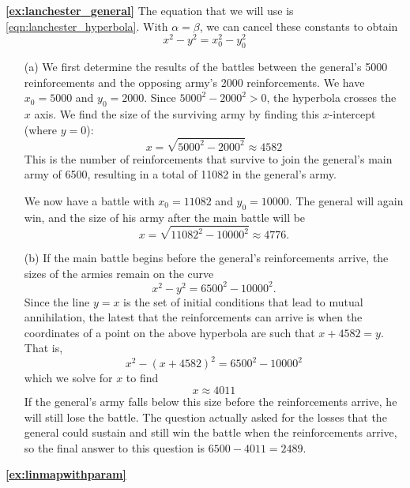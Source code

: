 \textbf{\ref{ex:lanchester_general}}
The equation that we will use is \eqref{eqn:lanchester_hyperbola}.
With $\alpha=\beta$,
we can cancel these constants to obtain
\[
   x^2 - y^2 = x_0^2 - y_0^2
\]
\begin{enumerate}
\item[(a)]
We first determine the results of the battles between the general's
5000 reinforcements and the opposing army's 2000 reinforcements.
We have $x_0=5000$ and $y_0=2000$.
Since $5000^2 - 2000^2 > 0$, the hyperbola crosses the $x$
axis.  We find the size of the surviving army by finding this
$x$-intercept (where $y=0$):
\[
   x = \sqrt{5000^2-2000^2} \approx 4582
\]
This is the number of reinforcements that survive to join
the general's main army of 6500, resulting in a total
of 11082 in the general's army.

We now have a battle with $x_0 = 11082$ and $y_0 = 10000$.
The general
will again win, and the size of his army after the main battle
will be
\[
   x = \sqrt{11082^2 - 10000^2} \approx 4776.
\]
\item[(b)]
If the main battle begins before the general's reinforcements arrive,
the sizes of the armies remain on the curve
\[
   x^2 - y^2 = 6500^2 - 10000^2.
\]
Since the line $y=x$ is the set of initial conditions
that lead to mutual annihilation, the latest that the 
reinforcements can arrive is when the coordinates of a point
on the above hyperbola are such that $x+4582 = y$.
That is,
\[
   x^2- (x+4582)^2 = 6500^2 - 10000^2
\]
which we solve for $x$ to find
\[
   x \approx 4011
\]
If the general's army falls below this size before the
reinforcements arrive, he will still lose the battle.
The question actually asked for the losses that the
general could sustain and still win the battle
when the reinforcements arrive, so the final answer
to this question is $6500-4011 = 2489$.
\end{enumerate}
%
%
\newpage
%
\textbf{\ref{ex:linmapwithparam}}
